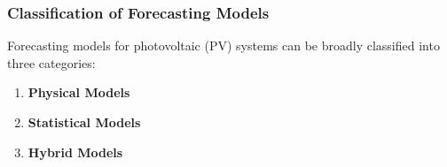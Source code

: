\begin{frame}
    \frametitle{Classification of Forecasting Models}
    Forecasting models for photovoltaic (PV) systems can be broadly
    classified into three categories:
    \vspace{0.4cm}
    \begin{enumerate}
        \item \textbf{Physical Models}
        \item \textbf{Statistical Models}
        \item \textbf{Hybrid Models}
    \end{enumerate}
\end{frame}